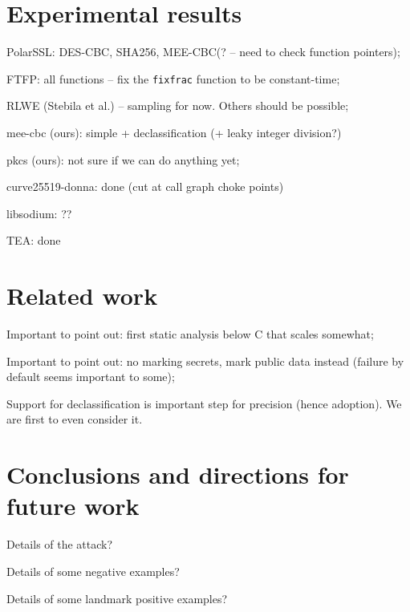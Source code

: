\documentclass[letterpaper,10pt]{IEEEtran} %
\begin{document}
\section{Experimental results}

\begin{compactitem}
\item PolarSSL: DES-CBC, SHA256, MEE-CBC(? -- need to check function pointers);
\item FTFP: all functions -- fix the \texttt{fixfrac} function to be
  constant-time;
\item RLWE (Stebila et al.) -- sampling for now. Others should be
  possible;
\item mee-cbc (ours): simple + declassification (+ leaky integer division?)
\item pkcs (ours): not sure if we can do anything yet;
\item curve25519-donna: done (cut at call graph choke points)
\item libsodium: ??
\item TEA: done
\end{compactitem}

\section{Related work}

\begin{compactitem}
\item Important to point out: first static analysis below C that scales somewhat;
\item Important to point out: no marking secrets, mark public data
  instead (failure by default seems important to some);
\item Support for declassification is important step for precision
  (hence adoption). We are first to even consider it.
\end{compactitem}

\section{Conclusions and directions for future work}





\appendix

\begin{compactitem}
\item Details of the attack?
\item Details of some negative examples?
\item Details of some landmark positive examples?
\end{compactitem}
\end{document}
